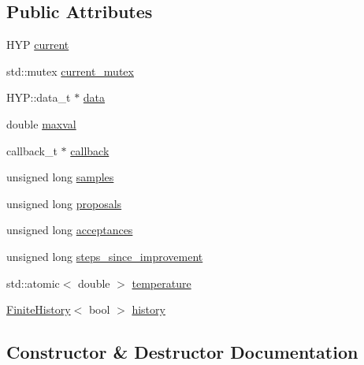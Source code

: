 \subsection*{Public Attributes}
\begin{DoxyCompactItemize}
\item 
H\+YP \hyperlink{class_m_c_m_c_chain_ab0c3b31e96d1f703bb8cf55c0575b4bd}{current}
\item 
std\+::mutex \hyperlink{class_m_c_m_c_chain_a42c355121fce0476426a49d5498c38a1}{current\+\_\+mutex}
\item 
H\+Y\+P\+::data\+\_\+t $\ast$ \hyperlink{class_m_c_m_c_chain_ab235f08fad93a9626ffb566c001ed5c9}{data}
\item 
double \hyperlink{class_m_c_m_c_chain_a3b8d31f47d75503321b432eeac0bb13b}{maxval}
\item 
callback\+\_\+t $\ast$ \hyperlink{class_m_c_m_c_chain_aa7a4a0d46ae2d9818c2f076f839badd7}{callback}
\item 
unsigned long \hyperlink{class_m_c_m_c_chain_a0d3ac649b04077cd0ffea236df560c91}{samples}
\item 
unsigned long \hyperlink{class_m_c_m_c_chain_aec2cdd6a3e25447c7f34e31d0d98dbcb}{proposals}
\item 
unsigned long \hyperlink{class_m_c_m_c_chain_ae1597e42074b2efb93ace3e40f1f7a45}{acceptances}
\item 
unsigned long \hyperlink{class_m_c_m_c_chain_aeac1cd63d13c397ba01cca35b605b786}{steps\+\_\+since\+\_\+improvement}
\item 
std\+::atomic$<$ double $>$ \hyperlink{class_m_c_m_c_chain_a7173287e1c0e681a9912a84c87320ece}{temperature}
\item 
\hyperlink{class_finite_history}{Finite\+History}$<$ bool $>$ \hyperlink{class_m_c_m_c_chain_a83cb52eb26bdb914c0eb483f541972a9}{history}
\end{DoxyCompactItemize}


\subsection{Constructor \& Destructor Documentation}
\mbox{\label{class_m_c_m_c_chain_aed5ffea5a46a380b8b0d78cd46c96a97}} 
